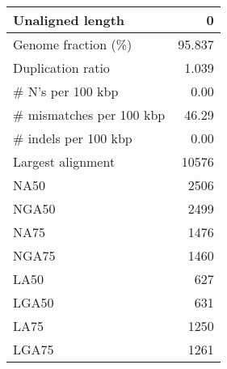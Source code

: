 \documentclass[12pt,a4paper]{article}
\begin{document}
\begin{table}[ht]
\begin{center}
\begin{tabular}{|l*{1}{|r}|}
Unaligned length & 0 \\ \hline
Genome fraction (\%) & 95.837 \\ \hline
Duplication ratio & 1.039 \\ \hline
\# N's per 100 kbp & 0.00 \\ \hline
\# mismatches per 100 kbp & 46.29 \\ \hline
\# indels per 100 kbp & 0.00 \\ \hline
Largest alignment & 10576 \\ \hline
NA50 & 2506 \\ \hline
NGA50 & 2499 \\ \hline
NA75 & 1476 \\ \hline
NGA75 & 1460 \\ \hline
LA50 & 627 \\ \hline
LGA50 & 631 \\ \hline
LA75 & 1250 \\ \hline
LGA75 & 1261 \\ \hline
\end{tabular}
\end{center}
\end{table}
\end{document}
